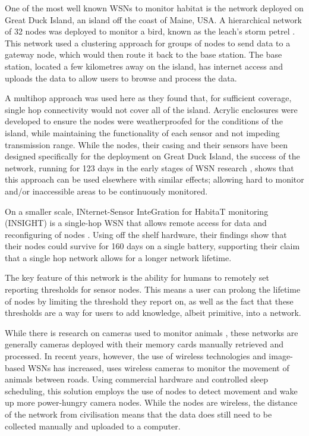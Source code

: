 	One of the most well known WSNs to monitor habitat is the network deployed on Great Duck Island, an island off the coast of Maine, USA. A hierarchical network of 32 nodes was deployed to monitor a bird, known as the leach’s storm petrel \cite{Mainwaring2002}. This network used a clustering approach for groups of nodes to send data to a gateway node, which would then route it back to the base station. The base station, located a few kilometres away on the island, has internet access and uploads the data to allow users to browse and process the data.

	A multihop approach was used here as they found that, for sufficient coverage, single hop connectivity would not cover all of the island. Acrylic enclosures were developed to ensure the nodes were weatherproofed for the conditions of the island, while maintaining the functionality of each sensor and not impeding transmission range. While the nodes, their casing and their sensors have been designed specifically for the deployment on Great Duck Island, the success of the network, running for 123 days in the early stages of WSN research \cite{Szewczyk2004c}, shows that this approach can be used elsewhere with similar effects; allowing hard to monitor and/or inaccessible areas to be continuously monitored.

	On a smaller scale, INternet-Sensor InteGration for HabitaT monitoring (INSIGHT) is a single-hop WSN that allows remote access for data and reconfiguring of nodes \cite{Demirbas}. Using off the shelf hardware, their findings show that their nodes could survive for 160 days on a single battery, supporting their claim that a single hop network allows for a longer network lifetime. 
	
	The key feature of this network is the ability for humans to remotely set reporting thresholds for sensor nodes. This means a user can prolong the lifetime of nodes by limiting the threshold they report on, as well as the fact that these thresholds are a way for users to add knowledge, albeit primitive, into a network.

	While there is research on cameras used to monitor animals \cite{Kays2009, Ahumada2011a}, these networks are generally cameras deployed with their memory cards manually retrieved and processed. In recent years, however, the use of wireless technologies and image-based WSNs has increased, \cite{Garcia-Sanchez2010b} uses wireless cameras to monitor the movement of animals between roads. Using commercial hardware and controlled sleep scheduling, this solution employs the use of nodes to detect movement and wake up more power-hungry camera nodes. While the nodes are wireless, the distance of the network from civilisation means that the data does still need to be collected manually and uploaded to a computer.

